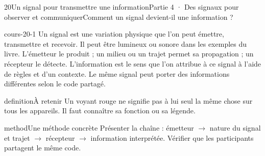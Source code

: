 \documentclass[12pt,twoside,openany]{book}
\begin{document}
\clearpage\pagestyle{otMain}
\begin{ouverture}[college4]{20}{Un signal pour transmettre une information}{Partie 4 · Des signaux pour observer et communiquer}{Comment un signal devient-il une information ?}
\end{ouverture}
\label{ch-20-cours-1}
\label{ess-20}
\begin{pcFiche}{cours-20-1}
Un signal est une variation physique que l’on peut émettre, transmettre et recevoir. Il peut être lumineux ou sonore dans les exemples du livre. L’émetteur le produit ; un milieu ou un trajet permet sa propagation ; un récepteur le détecte. L’information est le sens que l’on attribue à ce signal à l’aide de règles et d’un contexte. Le même signal peut porter des informations différentes selon le code partagé.\par
{}
\begin{pcEncadre}{definition}{À retenir}
Un voyant rouge ne signifie pas à lui seul la même chose sur tous les appareils. Il faut connaître sa fonction ou sa légende.\par
\end{pcEncadre}
\begin{pcEncadre}{method}{Une méthode concrète}
Présenter la chaîne : émetteur \(\rightarrow\) nature du signal et trajet \(\rightarrow\) récepteur \(\rightarrow\) information interprétée. Vérifier que les participants partagent le même code.\par
\end{pcEncadre}
\end{pcFiche}
\label{ch-20-cours-2}
\end{document}
